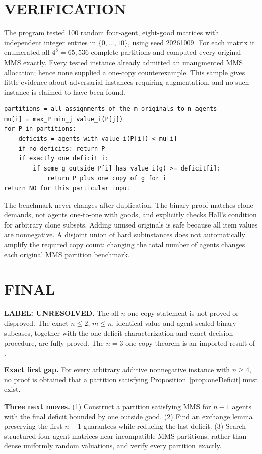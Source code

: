 \documentclass[11pt,a4paper]{article}
\theoremstyle{remark}\newtheorem{remark}[theorem]{Remark}
\begin{document}
\section{VERIFICATION}
The program tested 100 random four-agent, eight-good matrices with independent integer entries in $\{0,\ldots,10\}$, using seed 20261009. For each matrix it enumerated all $4^8=65{,}536$ complete partitions and computed every original MMS exactly. Every tested instance already admitted an unaugmented MMS allocation; hence none supplied a one-copy counterexample. This sample gives little evidence about adversarial instances requiring augmentation, and no such instance is claimed to have been found.
\begin{lstlisting}
partitions = all assignments of the m originals to n agents
mu[i] = max_P min_j value_i(P[j])
for P in partitions:
    deficits = agents with value_i(P[i]) < mu[i]
    if no deficits: return P
    if exactly one deficit i:
        if some g outside P[i] has value_i(g) >= deficit[i]:
            return P plus one copy of g for i
return NO for this particular input
\end{lstlisting}
The benchmark never changes after duplication. The binary proof matches clone demands, not agents one-to-one with goods, and explicitly checks Hall's condition for arbitrary clone subsets. Adding unused originals is safe because all item values are nonnegative. A disjoint union of hard subinstances does not automatically amplify the required copy count: changing the total number of agents changes each original MMS partition benchmark.

\section{FINAL}
\textbf{LABEL: UNRESOLVED.}
The all-$n$ one-copy statement is not proved or disproved. The exact $n\le2$, $m\le n$, identical-value and agent-scaled binary subcases, together with the one-deficit characterization and exact decision procedure, are fully proved. The $n=3$ one-copy theorem is an imported result of \cite{augmentation}.

\textbf{Exact first gap.} For every arbitrary additive nonnegative instance with $n\ge4$, no proof is obtained that a partition satisfying Proposition~\ref{prop:oneDeficit} must exist.

\textbf{Three next moves.} (1) Construct a partition satisfying MMS for $n-1$ agents with the final deficit bounded by one outside good. (2) Find an exchange lemma preserving the first $n-1$ guarantees while reducing the last deficit. (3) Search structured four-agent matrices near incompatible MMS partitions, rather than dense uniformly random valuations, and verify every partition exactly.
\end{document}
